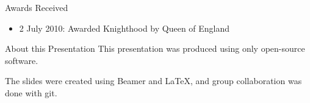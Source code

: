 \documentclass[xcolor=dvipsnames]{beamer}
\begin{document}
\begin{frame}{Awards Received}
  \begin{itemize}
    \item 2 July 2010: Awarded Knighthood by Queen of England
  \end{itemize}
  \end{frame}
\begin{frame}{About this Presentation}
  This presentation was produced using only open-source software.

  The slides were created using Beamer and LaTeX, and group collaboration was done
  with git.
\end{frame}
\end{document}

